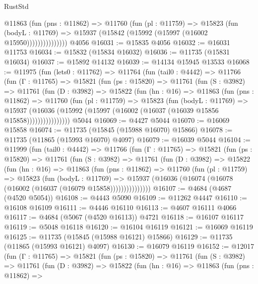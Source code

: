 \begin{lexlean}{RustStd}
\begin{coremodule}
                  @11863
                    (fun (pns : @11862) =>
                    @11760
                      (fun (pl : @11759) =>
                      @15823
                        (fun (bodyL : @11769) =>
                        @15937 (@15842 (@15992 (@15997 (@16002 @15950)))))))))))))))
    @4056
@16031 := @15835 @4056
@16032 := @16031 @11753
@16034 := @15832 (@15834 @16032)
@16036 := @11735 (@15831 @16034)
@16037 := @15892 @14132
@16039 := @14134 @15945 @13533
@16068 := @11975
    (fun (lets0 : @11762) =>
    @11764
      (fun (tail0 : @4442) =>
      @11766
        (fun (Γ : @11765) =>
        @15821
          (fun (ps : @15820) =>
          @11761
            (fun (S : @3982) =>
            @11761
              (fun (D : @3982) =>
              @15822
                (fun (hn : @16) =>
                @11863
                  (fun (pns : @11862) =>
                  @11760
                    (fun (pl : @11759) =>
                    @15823
                      (fun (bodyL : @11769) =>
                      @15937
                        (@16036
                          (@15992 (@15997 (@16002 (@16037 (@16039 @15856 @15858))))))))))))))))
    @5044
@16069 := @4427 @5044
@16070 := @16069 @15858
@16074 := @11735 (@15845 (@15988 @16070) @15866)
@16078 := @11735 (@11865 (@15993 @16070) @4097)
@16079 := @16039 @5044
@16104 := @11999
    (fun (tail0 : @4442) =>
    @11766
      (fun (Γ : @11765) =>
      @15821
        (fun (ps : @15820) =>
        @11761
          (fun (S : @3982) =>
          @11761
            (fun (D : @3982) =>
            @15822
              (fun (hn : @16) =>
              @11863
                (fun (pns : @11862) =>
                @11760
                  (fun (pl : @11759) =>
                  @15823
                    (fun (bodyL : @11769) =>
                    @15937 (@16036 (@16074 (@16078 (@16002 (@16037 (@16079 @15858)))))))))))))))
@16107 := @4684 (@4687 (@4520 @5054))
@16108 := @4443 @5090
@16109 := @11262 @4447
@16110 := @16108 @16109
@16111 := @4446 @16110
@16113 := @4607 @16111 @4066
@16117 := @4684 (@5067 (@4520 @16113)) @4721
@16118 := @16107 @16117
@16119 := @5048 @16118
@16120 := @16104 @16119
@16121 := @16069 @16119
@16125 := @11735 (@15845 (@15988 @16121) @15866)
@16129 := @11735 (@11865 (@15993 @16121) @4097)
@16130 := @16079 @16119
@16152 := @12017
    (fun (Γ : @11765) =>
    @15821
      (fun (ps : @15820) =>
      @11761
        (fun (S : @3982) =>
        @11761
          (fun (D : @3982) =>
          @15822
            (fun (hn : @16) =>
            @11863
              (fun (pns : @11862) =>

\end{coremodule}
\end{lexlean}
